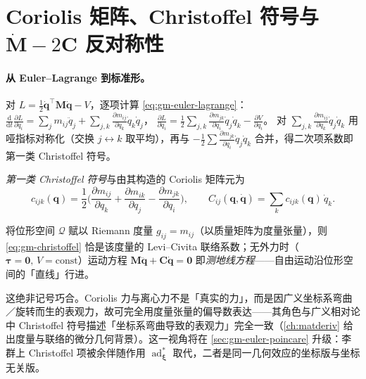 \section{Coriolis 矩阵、Christoffel 符号与 \texorpdfstring{$\dot{\mathbf M}-2\mathbf C$}{Mdot-2C} 反对称性}
\label{sec:gm-christoffel}

\paragraph{从 Euler--Lagrange 到标准形。}
对 $L=\tfrac12\dot{\mathbf q}^\top\mathbf M\dot{\mathbf q}-V$，逐项计算 \cref{eq:gm-euler-lagrange}：
$\tfrac{\mathrm d}{\mathrm dt}\tfrac{\partial L}{\partial\dot q_i}=\sum_j m_{ij}\ddot q_j+\sum_{j,k}\tfrac{\partial m_{ij}}{\partial q_k}\dot q_k\dot q_j$，
$\tfrac{\partial L}{\partial q_i}=\tfrac12\sum_{j,k}\tfrac{\partial m_{jk}}{\partial q_i}\dot q_j\dot q_k-\tfrac{\partial V}{\partial q_i}$。
对 $\sum_{j,k}\tfrac{\partial m_{ij}}{\partial q_k}\dot q_j\dot q_k$ 用哑指标对称化（交换 $j\leftrightarrow k$ 取平均），再与 $-\tfrac12\sum\tfrac{\partial m_{jk}}{\partial q_i}\dot q_j\dot q_k$ 合并，得二次项系数即第一类 Christoffel 符号。

\begin{definition}\label{def:gm-christoffel}
\emph{第一类 Christoffel 符号}与由其构造的 Coriolis 矩阵元为
\begin{equation}
  c_{ijk}(\mathbf q)=\frac12\Big(\frac{\partial m_{ij}}{\partial q_k}+\frac{\partial m_{ik}}{\partial q_j}-\frac{\partial m_{jk}}{\partial q_i}\Big),\qquad
  C_{ij}(\mathbf q,\dot{\mathbf q})=\sum_k c_{ijk}(\mathbf q)\,\dot q_k.
  \label{eq:gm-christoffel}
\end{equation}
\end{definition}

\begin{theorem}\label{thm:gm-levicivita}
将位形空间 $\mathcal Q$ 赋以 Riemann 度量 $g_{ij}=m_{ij}$（以质量矩阵为度量张量），则 \cref{eq:gm-christoffel} 恰是该度量的 Levi--Civita 联络系数；无外力时（$\boldsymbol\tau=\mathbf0,\,V=\mathrm{const}$）运动方程 $\mathbf M\ddot{\mathbf q}+\mathbf C\dot{\mathbf q}=\mathbf0$ 即\emph{测地线方程}——自由运动沿位形空间的「直线」行进。
\end{theorem}

\begin{insight}
这绝非记号巧合。Coriolis 力与离心力不是「真实的力」，而是因广义坐标系弯曲／旋转而生的表观力，故可完全用度量张量的偏导数表达——其角色与广义相对论中 Christoffel 符号描述「坐标系弯曲导致的表观力」完全一致（\cref{ch:matderiv} 给出度量与联络的微分几何背景）。这一视角将在 \cref{sec:gm-euler-poincare} 升级：李群上 Christoffel 项被余伴随作用 $\operatorname{ad}^*_{\boldsymbol\xi}$ 取代，二者是同一几何效应的坐标版与坐标无关版。
\end{insight}

